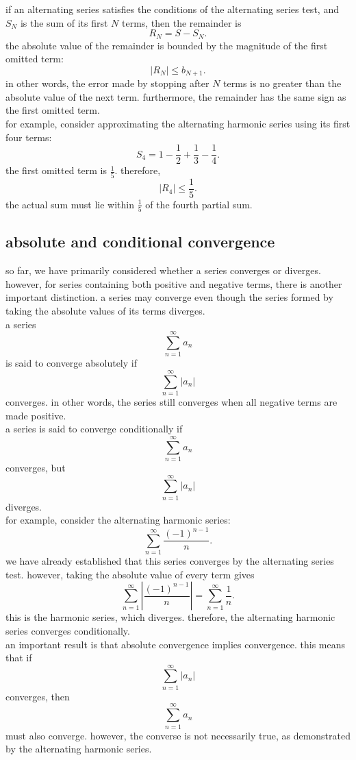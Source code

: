 \documentclass{article}
\begin{document}
if an alternating series satisfies the conditions of the alternating series test, and $S_N$ is the sum of its first $N$ terms, then the remainder is
\[
R_N=S-S_N.
\]
the absolute value of the remainder is bounded by the magnitude of the first omitted term:
\[
\boxed{
|R_N|\leq b_{N+1}.
}
\]
in other words, the error made by stopping after $N$ terms is no greater than the absolute value of the next term. furthermore, the remainder has the same sign as the first omitted term.\\

for example, consider approximating the alternating harmonic series using its first four terms:
\[
S_4=1-\frac{1}{2}+\frac{1}{3}-\frac{1}{4}.
\]
the first omitted term is $\frac{1}{5}$. therefore,
\[
|R_4|\leq\frac{1}{5}.
\]
the actual sum must lie within $\frac{1}{5}$ of the fourth partial sum.\\

\subsection{absolute and conditional convergence}

so far, we have primarily considered whether a series converges or diverges. however, for series containing both positive and negative terms, there is another important distinction. a series may converge even though the series formed by taking the absolute values of its terms diverges.\\

a series
\[
\sum_{n=1}^{\infty}a_n
\]
is said to converge absolutely if
\[
\sum_{n=1}^{\infty}|a_n|
\]
converges. in other words, the series still converges when all negative terms are made positive.\\

a series is said to converge conditionally if
\[
\sum_{n=1}^{\infty}a_n
\]
converges, but
\[
\sum_{n=1}^{\infty}|a_n|
\]
diverges.\\

for example, consider the alternating harmonic series:
\[
\sum_{n=1}^{\infty}\frac{(-1)^{n-1}}{n}.
\]
we have already established that this series converges by the alternating series test. however, taking the absolute value of every term gives
\[
\sum_{n=1}^{\infty}
\left|\frac{(-1)^{n-1}}{n}\right|
=
\sum_{n=1}^{\infty}\frac{1}{n}.
\]
this is the harmonic series, which diverges. therefore, the alternating harmonic series converges conditionally.\\

an important result is that absolute convergence implies convergence. this means that if
\[
\sum_{n=1}^{\infty}|a_n|
\]
converges, then
\[
\sum_{n=1}^{\infty}a_n
\]
must also converge. however, the converse is not necessarily true, as demonstrated by the alternating harmonic series.\\
\end{document}
